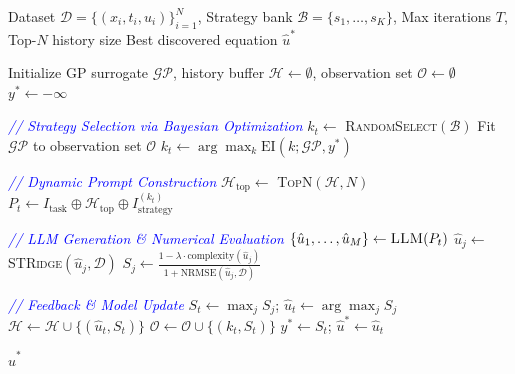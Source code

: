 \documentclass[twoside,11pt]{article}
\newcommand{\1}{{\bf 1}}
\newcommand{\0}{{\bf 0}}
\begin{document}
\begin{algorithm}[!htbp]
\caption{\textsc{NeuroSym-BO}: Dynamic Instruction Tuning for PDE Discovery}
\label{alg:neurosymbo}
\begin{algorithmic}[1]
\Require Dataset $\mathcal{D} = \{(x_i, t_i, u_i)\}_{i=1}^N$, Strategy bank $\mathcal{B} = \{s_1, \ldots, s_K\}$, Max iterations $T$, Top-$N$ history size
\Ensure Best discovered equation $\hat{u}^*$

\State Initialize GP surrogate $\mathcal{GP}$, history buffer $\mathcal{H} \leftarrow \emptyset$, observation set $\mathcal{O} \leftarrow \emptyset$
\State $y^* \leftarrow -\infty$ 

    \State \textcolor{blue}{\textit{// Strategy Selection via Bayesian Optimization}}
     
        \State $k_t \leftarrow$ \textsc{RandomSelect}$(\mathcal{B})$
    \Else
        \State Fit $\mathcal{GP}$ to observation set $\mathcal{O}$
        \State $k_t \leftarrow \arg\max_{k} \text{EI}(k; \mathcal{GP}, y^*)$ 
    \EndIf
    
    \State \textcolor{blue}{\textit{// Dynamic Prompt Construction}}
    \State $\mathcal{H}_{\text{top}} \leftarrow$ \textsc{TopN}$(\mathcal{H}, N)$ 
    \State $P_t \leftarrow I_{\text{task}} \oplus \mathcal{H}_{\text{top}} \oplus I_{\text{strategy}}^{(k_t)}$ 
    
    \State \textcolor{blue}{\textit{// LLM Generation \& Numerical Evaluation}}
    \State $\{\hat{u}_1, \ldots, \hat{u}_M\} \leftarrow \textsc{LLM}(P_t)$ 
        \State $\hat{u}_j \leftarrow$ \textsc{STRidge}$(\hat{u}_j, \mathcal{D})$ 
        \State $S_j \leftarrow \frac{1 - \lambda \cdot \text{complexity}(\hat{u}_j)}{1 + \text{NRMSE}(\hat{u}_j, \mathcal{D})}$ 
    \EndFor
    
    \State \textcolor{blue}{\textit{// Feedback \& Model Update}}
    \State $S_t \leftarrow \max_j S_j$; \quad $\hat{u}_t \leftarrow \arg\max_j S_j$
    \State $\mathcal{H} \leftarrow \mathcal{H} \cup \{(\hat{u}_t, S_t)\}$
    \State $\mathcal{O} \leftarrow \mathcal{O} \cup \{(k_t, S_t)\}$ 
        \State $y^* \leftarrow S_t$; \quad $\hat{u}^* \leftarrow \hat{u}_t$
    \EndIf
\EndFor

\State \Return $\hat{u}^*$
\end{algorithmic}
\end{algorithm}
\end{document}
